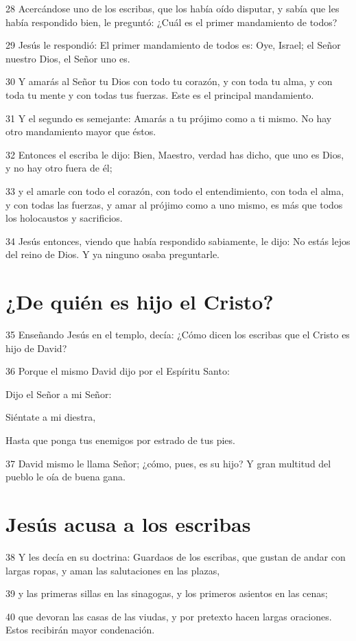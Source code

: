 \par 28 Acercándose uno de los escribas, que los había oído disputar, y sabía que les había respondido bien, le preguntó: ¿Cuál es el primer mandamiento de todos?
\par 29 Jesús le respondió: El primer mandamiento de todos es: Oye, Israel; el Señor nuestro Dios, el Señor uno es.
\par 30 Y amarás al Señor tu Dios con todo tu corazón, y con toda tu alma, y con toda tu mente y con todas tus fuerzas. Este es el principal mandamiento.
\par 31 Y el segundo es semejante: Amarás a tu prójimo como a ti mismo. No hay otro mandamiento mayor que éstos.
\par 32 Entonces el escriba le dijo: Bien, Maestro, verdad has dicho, que uno es Dios, y no hay otro fuera de él;
\par 33 y el amarle con todo el corazón, con todo el entendimiento, con toda el alma, y con todas las fuerzas, y amar al prójimo como a uno mismo, es más que todos los holocaustos y sacrificios.
\par 34 Jesús entonces, viendo que había respondido sabiamente, le dijo: No estás lejos del reino de Dios. Y ya ninguno osaba preguntarle.

\section*{¿De quién es hijo el Cristo?}

\par 35 Enseñando Jesús en el templo, decía: ¿Cómo dicen los escribas que el Cristo es hijo de David?
\par 36 Porque el mismo David dijo por el Espíritu Santo:
\par Dijo el Señor a mi Señor:
\par Siéntate a mi diestra,
\par Hasta que ponga tus enemigos por estrado de tus pies.
\par 37 David mismo le llama Señor; ¿cómo, pues, es su hijo? Y gran multitud del pueblo le oía de buena gana.

\section*{Jesús acusa a los escribas}

\par 38 Y les decía en su doctrina: Guardaos de los escribas, que gustan de andar con largas ropas, y aman las salutaciones en las plazas,
\par 39 y las primeras sillas en las sinagogas, y los primeros asientos en las cenas;
\par 40 que devoran las casas de las viudas, y por pretexto hacen largas oraciones. Estos recibirán mayor condenación.

